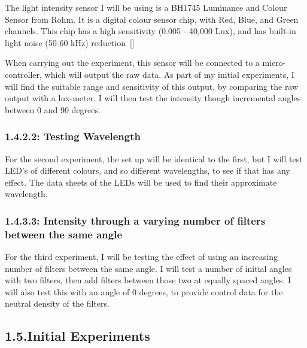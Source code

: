 \documentclass{article}
\begin{document}
The light intensity sensor I will be using is a BH1745 Luminance and Colour Sensor from Rohm. It is a digital colour sensor chip, with Red, Blue, and Green channels. This chip has a high sensitivity (0.005 - 40,000 Lux), and has built-in light noise (50-60 kHz) reduction~{}[]%

When carrying out the experiment, this sensor will be connected to a micro-controller, which will output the raw data. As part of my initial experiments, I will find the suitable range and sensitivity of this output, by comparing the raw output with a lux-meter. I will then test the intensity though incremental angles between 0 and 90 degrees.%

\subsubsection{1.4.2.\hspace*{0.5em}2: Testing Wavelength}\label{sec-2--testing-wavelength}%

\noindent{}For the second experiment, the set up will be identical to the first, but I will test LED's of different colours, and so different wavelengths, to see if that has any effect. The data sheets of the LEDs will be used to find their approximate wavelength.%

\subsubsection{1.4.3.\hspace*{0.5em}3: Intensity through a varying number of filters between the same angle}\label{sec-3--intensity-through-a-varying-number-of-filters-between-the-same-angle}%

\noindent{}For the third experiment, I will be testing the effect of using an increasing number of filters between the same angle. I will test a number of initial angles with two filters, then add filters between those two at equally spaced angles. I will also test this with an angle of 0 degrees, to provide control data for the neutral density of the filters.%

\subsection{1.5.\hspace*{0.5em}Initial Experiments}\label{sec-initial-experiments}%
\end{document}
